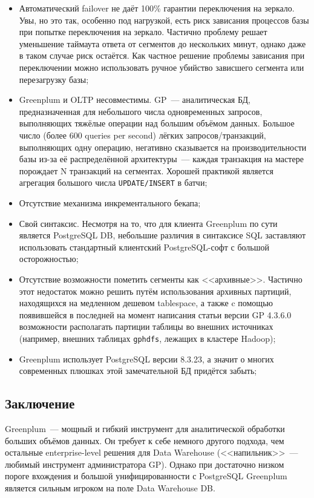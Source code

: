 \begin{itemize}
  \item Автоматический failover не даёт 100\% гарантии переключения на зеркало. Увы, но это так, особенно под нагрузкой, есть риск зависания процессов базы при попытке переключения на зеркало. Частично проблему решает уменьшение таймаута ответа от сегментов до нескольких минут, однако даже в таком случае риск остаётся. Как частное решение проблемы зависания при переключении можно использовать ручное убийство зависшего сегмента или перезагрузку базы;
  \item Greenplum и OLTP несовместимы. GP~--- аналитическая БД, предназначенная для небольшого числа одновременных запросов, выполняющих тяжёлые операции над большим объёмом данных. Большое число (более 600 queries per second) лёгких запросов/транзакций, выполняющих одну операцию, негативно сказывается на производительности базы из-за её распределённой архитектуры~--- каждая транзакция на мастере порождает N транзакций на сегментах. Хорошей практикой является агрегация большого числа \lstinline!UPDATE/INSERT! в батчи;
  \item Отсутствие механизма инкрементального бекапа;
  \item Свой синтаксис. Несмотря на то, что для клиента Greenplum по сути является PostgreSQL DB, небольшие различия в синтаксисе SQL заставляют использовать стандартный клиентский PostgreSQL-софт с большой осторожностью;
  \item Отсутствие возможности пометить сегменты как <<архивные>>. Частично этот недостаток можно решить путём использования архивных партиций, находящихся на медленном дешевом tablespace, а также c помощью появившейся в последней на момент написания статьи версии GP 4.3.6.0 возможности располагать партиции таблицы во внешних источниках (например, внешних таблицах \lstinline!gphdfs!, лежащих в кластере Hadoop);
  \item Greenplum использует PostgreSQL версии 8.3.23, а значит о многих современных плюшках этой замечательной БД придётся забыть;
\end{itemize}


\subsection{Заключение}

Greenplum~--- мощный и гибкий инструмент для аналитической обработки больших объёмов данных. Он требует к себе немного другого подхода, чем остальные enterprise-level решения для Data Warehouse (<<напильник>>~--- любимый инструмент администратора GP). Однако при достаточно низком пороге вхождения и большой унифицированности с PostgreSQL Greenplum является сильным игроком на поле Data Warehouse DB.
